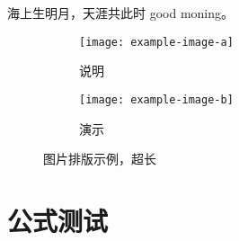 海上生明月，天涯共此时 good moning。
\zhlipsum[1]


\begin{figure}[h!]
	\centering
	\begin{subfigure}{0.4\linewidth}
		\centering
		\texttt{[image: example-image-a]}
		\caption{说明}\label{}
	\end{subfigure}
	\hfil
	\begin{subfigure}{0.4\linewidth}
		\centering
		\texttt{[image: example-image-b]}
		\caption{演示}\label{}
	\end{subfigure}
	\caption{图片排版示例，超长}
\end{figure}

\section{公式测试}

